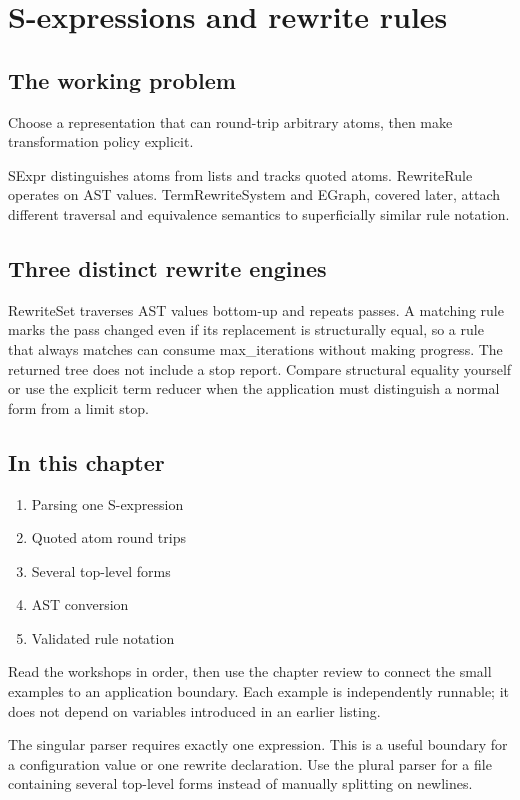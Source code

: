 \chapter{S-expressions and rewrite rules}\label{ch:7}
\section*{The working problem}
Choose a representation that can round-trip arbitrary atoms, then make transformation policy explicit.

SExpr distinguishes atoms from lists and tracks quoted atoms. RewriteRule operates on AST values. TermRewriteSystem and EGraph, covered later, attach different traversal and equivalence semantics to superficially similar rule notation.

\section*{Three distinct rewrite engines}
RewriteSet traverses AST values bottom-up and repeats passes. A matching rule marks the pass changed even if its replacement is structurally equal, so a rule that always matches can consume max\_iterations without making progress. The returned tree does not include a stop report. Compare structural equality yourself or use the explicit term reducer when the application must distinguish a normal form from a limit stop.

\section*{In this chapter}
\begin{enumerate}
\item Parsing one S-expression
\item Quoted atom round trips
\item Several top-level forms
\item AST conversion
\item Validated rule notation
\end{enumerate}
Read the workshops in order, then use the chapter review to connect the small examples to an application boundary. Each example is independently runnable; it does not depend on variables introduced in an earlier listing.

\clearpage
{}
The singular parser requires exactly one expression. This is a useful boundary for a configuration value or one rewrite declaration. Use the plural parser for a file containing several top-level forms instead of manually splitting on newlines.

